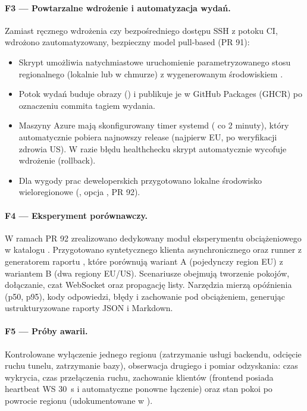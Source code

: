 \paragraph{F3 --- Powtarzalne wdrożenie i automatyzacja wydań.}
Zamiast ręcznego wdrożenia czy bezpośredniego dostępu SSH z potoku CI, wdrożono
zautomatyzowany, bezpieczny model pull-based (PR 91):
\begin{itemize}
  \item Skrypt  umożliwia natychmiastowe
        uruchomienie parametryzowanego stosu regionalnego (lokalnie lub w chmurze) z
        wygenerowanym środowiskiem .
  \item Potok wydań  buduje obrazy
        () i publikuje je w GitHub Packages (GHCR) po oznaczeniu
        commita tagiem wydania.
  \item Maszyny Azure mają skonfigurowany timer systemd ( co
        2 minuty), który automatycznie pobiera najnowszy release (najpierw EU, po
        weryfikacji zdrowia US). W razie błędu healthchecku skrypt automatycznie
        wycofuje wdrożenie (rollback).
  \item Dla wygody prac deweloperskich przygotowano lokalne środowisko
        wieloregionowe (, opcja , PR 92).
\end{itemize}

\paragraph{F4 --- Eksperyment porównawczy.}
W ramach PR 92 zrealizowano dedykowany moduł eksperymentu obciążeniowego w katalogu
. Przygotowano syntetycznego klienta asynchronicznego oraz
runner  z generatorem raportu , które porównują wariant
A (pojedynczy region EU) z wariantem B (dwa regiony EU/US). Scenariusze obejmują
tworzenie pokojów, dołączanie, czat WebSocket oraz propagację listy. Narzędzia
mierzą opóźnienia (p50, p95), kody odpowiedzi, błędy i zachowanie pod obciążeniem,
generując ustrukturyzowane raporty JSON i Markdown.

\paragraph{F5 --- Próby awarii.}
Kontrolowane wyłączenie jednego regionu (zatrzymanie usługi backendu, odcięcie
ruchu tunelu, zatrzymanie bazy), obserwacja drugiego i pomiar odzyskania: czas
wykrycia, czas przełączenia ruchu, zachowanie klientów (frontend posiada heartbeat
WS 30~s i automatyczne ponowne łączenie) oraz stan pokoi po powrocie regionu
(udokumentowane w ).

